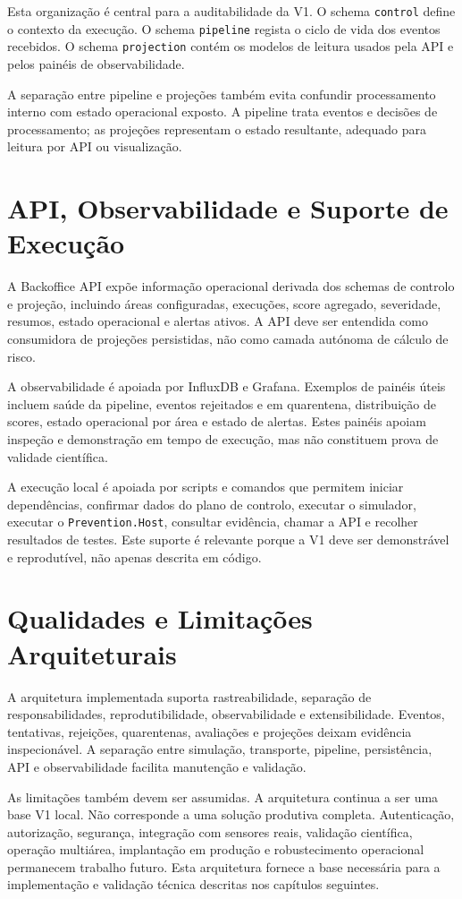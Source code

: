 Esta organização é central para a auditabilidade da V1. O schema \texttt{control} define o contexto da execução. O schema \texttt{pipeline} regista o ciclo de vida dos eventos recebidos. O schema \texttt{projection} contém os modelos de leitura usados pela API e pelos painéis de observabilidade.

A separação entre pipeline e projeções também evita confundir processamento interno com estado operacional exposto. A pipeline trata eventos e decisões de processamento; as projeções representam o estado resultante, adequado para leitura por API ou visualização.

\section{API, Observabilidade e Suporte de Execução}

A Backoffice API expõe informação operacional derivada dos schemas de controlo e projeção, incluindo áreas configuradas, execuções, score agregado, severidade, resumos, estado operacional e alertas ativos. A API deve ser entendida como consumidora de projeções persistidas, não como camada autónoma de cálculo de risco.

A observabilidade é apoiada por InfluxDB e Grafana. Exemplos de painéis úteis incluem saúde da pipeline, eventos rejeitados e em quarentena, distribuição de scores, estado operacional por área e estado de alertas. Estes painéis apoiam inspeção e demonstração em tempo de execução, mas não constituem prova de validade científica.

A execução local é apoiada por scripts e comandos que permitem iniciar dependências, confirmar dados do plano de controlo, executar o simulador, executar o \texttt{Prevention.Host}, consultar evidência, chamar a API e recolher resultados de testes. Este suporte é relevante porque a V1 deve ser demonstrável e reprodutível, não apenas descrita em código.

\section{Qualidades e Limitações Arquiteturais}

A arquitetura implementada suporta rastreabilidade, separação de responsabilidades, reprodutibilidade, observabilidade e extensibilidade. Eventos, tentativas, rejeições, quarentenas, avaliações e projeções deixam evidência inspecionável. A separação entre simulação, transporte, pipeline, persistência, API e observabilidade facilita manutenção e validação.

As limitações também devem ser assumidas. A arquitetura continua a ser uma base V1 local. Não corresponde a uma solução produtiva completa. Autenticação, autorização, segurança, integração com sensores reais, validação científica, operação multiárea, implantação em produção e robustecimento operacional permanecem trabalho futuro.
Esta arquitetura fornece a base necessária para a implementação e validação técnica descritas nos capítulos seguintes.